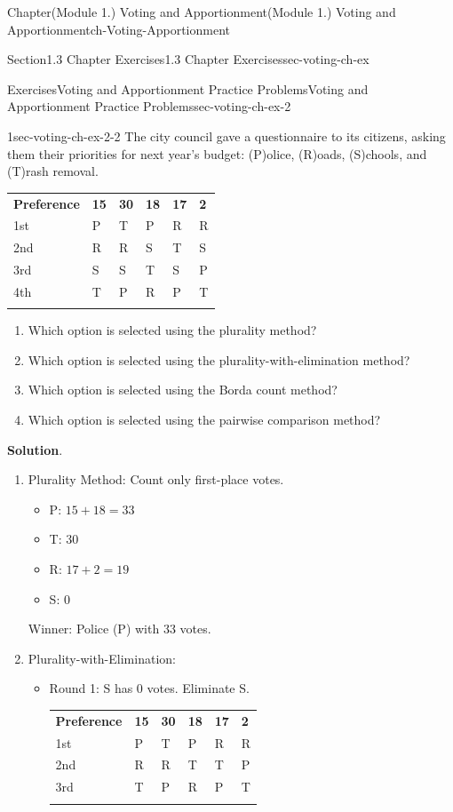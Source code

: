 \documentclass[oneside,10pt,]{book}
\newcommand{\blocktitlefont}{\relax}
\newcommand{\tabularfont}{\relax}
\newcommand{\ptxlistdisc}{\raisebox{0.3ex}{\textbullet}}
\newcommand{\hrulethin}  {\noalign{\hrule height 0.04em}}
\begin{document}
\begin{chapterptx}{Chapter}{(Module 1.) Voting and Apportionment}{}{(Module 1.) Voting and Apportionment}{}{}{ch-Voting-Apportionment}
\begin{sectionptx}{Section}{1.3 Chapter Exercises}{}{1.3 Chapter Exercises}{}{}{sec-voting-ch-ex}
\begin{exercises-subsection-numberless}{Exercises}{Voting and Apportionment Practice Problems}{}{Voting and Apportionment Practice Problems}{}{}{sec-voting-ch-ex-2}
\begin{divisionexercise}{1}{}{}{sec-voting-ch-ex-2-2}
The city council gave a questionnaire to its citizens, asking them their priorities for next year's budget: (P)olice, (R)oads, (S)chools, and (T)rash removal.%
\begin{center}%
{\tabularfont%
\begin{tabular}{llllll}\hrulethin
{\bfseries{}Preference}&{\bfseries{}15}&{\bfseries{}30}&{\bfseries{}18}&{\bfseries{}17}&{\bfseries{}2}\tabularnewline\hrulethin
1st&P&T&P&R&R\tabularnewline\hrulethin
2nd&R&R&S&T&S\tabularnewline\hrulethin
3rd&S&S&T&S&P\tabularnewline\hrulethin
4th&T&P&R&P&T\tabularnewline\hrulethin
\end{tabular}
}%
\end{center}%
%
\begin{enumerate}[label={(\alph*)}]
\item{}Which option is selected using the plurality method?%
\item{}Which option is selected using the plurality-with-elimination method?%
\item{}Which option is selected using the Borda count method?%
\item{}Which option is selected using the pairwise comparison method?%
\end{enumerate}
\par\smallskip%
\noindent\textbf{\blocktitlefont Solution}.\hypertarget{sec-voting-ch-ex-2-2-2}{}\quad{}%
\begin{enumerate}[label={(\alph*)}]
\item{}Plurality Method: Count only first-place votes.%
%
\begin{itemize}[label=\ptxlistdisc]
\item{}P: \(15 + 18 = 33\)%
\item{}T: \(30\)%
\item{}R: \(17 + 2 = 19\)%
\item{}S: \(0\)%
\end{itemize}
Winner: Police (P) with 33 votes.%
\item{}Plurality-with-Elimination:%
\begin{itemize}[label=\ptxlistdisc]
\item{}Round 1: S has 0 votes. Eliminate S. \begin{center}%
{\tabularfont%
\begin{tabular}{llllll}\hrulethin
{\bfseries{}Preference}&{\bfseries{}15}&{\bfseries{}30}&{\bfseries{}18}&{\bfseries{}17}&{\bfseries{}2}\tabularnewline\hrulethin
1st&P&T&P&R&R\tabularnewline\hrulethin
2nd&R&R&T&T&P\tabularnewline\hrulethin
3rd&T&P&R&P&T\tabularnewline\hrulethin

\end{tabular}}
\end{center}
\end{itemize}
\end{enumerate}
\end{divisionexercise}
\end{exercises-subsection-numberless}
\end{sectionptx}
\end{chapterptx}
\end{document}
